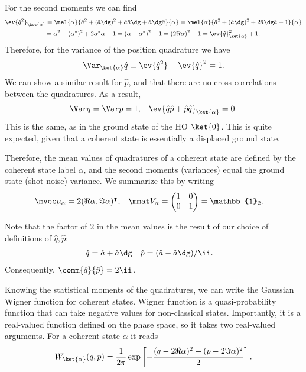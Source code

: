\documentclass[fontsize=9pt]{scrartcl}
\begin{document}
For the second moments we can find
\begin{multline}
  \ev{ \hat q^2 }_{\ket{\alpha}}
  = \mel{ \alpha }{ \hat a^2 + (\hat a\dg)^2 + \hat a \hat a\dg + \hat a\dg \hat a }{ \alpha }
  = \mel{ \alpha }{ \hat a^2 + (\hat a\dg)^2 + 2 \hat a\dg \hat a + 1 }{ \alpha }
  \\
  = \alpha^2 + ( \alpha^* )^2 + 2 \alpha^* \alpha + 1
  = ( \alpha + \alpha^* )^2 + 1
  = ( 2 \Re \alpha )^2 + 1
  = \ev{ \hat q }_{\ket{ \alpha }}^2 + 1.
\end{multline}
Therefore, for the variance of the position quadrature we have
\begin{equation}
  \Var _{\ket{ \alpha }} \hat q  \equiv \ev{ \hat q^2 } - \ev{ \hat q }^2 = 1.
\end{equation}
We can show a similar result for $\hat p$, and that there are no cross-correlations between the quadratures.
As a result,
\begin{align}
  \Var q & = \Var p = 1,
  &
  \ev{ \hat q \hat p + \hat p \hat q } _{\ket{ \alpha }} = 0.
\end{align}
This is the same, as in the ground state of the HO $\ket{0}$.
This is quite expected, given that a coherent state is essentially a displaced ground state.


Therefore, the mean values of quadratures of a coherent state are defined by the coherent state label $\alpha$, and the second moments (variances) equal the ground state (shot-noise) variance.
We summarize this by writing
\begin{align}
  \mvec \mu_\alpha & = 2 ( \Re \alpha , \Im \alpha )^\intercal,
  &
  \mmat V _\alpha & =
  \begin{pmatrix}
    1 & 0 \\ 0 & 1
  \end{pmatrix} = \mathbb{1}_2.
\end{align}

Note that the factor of $2$ in the mean values is the result of our choice of definitions of $\hat q, \hat p$:
\begin{align}
  \hat q & = \hat a + \hat a \dg
  &
  \hat p & = ( \hat a - \hat a\dg ) / \ii.
\end{align}
Consequently, $\comm{ \hat q }{ \hat p } = 2 \ii$.

Knowing the statistical moments of the quadratures, we can write the Gaussian Wigner function for coherent states.
Wigner function is a quasi-probability function that can take negative values for non-classical states.
Importantly, it is a real-valued function defined on the phase space, so it takes two real-valued arguments.
For a coherent state $\alpha$ it reads
\begin{equation}
  W_{\ket{\alpha}} (q,p)
  =
  \frac{ 1 }{ 2 \pi }
  \exp\left[
  - \frac{ ( q - 2 \Re \alpha )^2 + ( p - 2 \Im \alpha)^2 }{ 2 }
  \right].
\end{equation}
\end{document}
